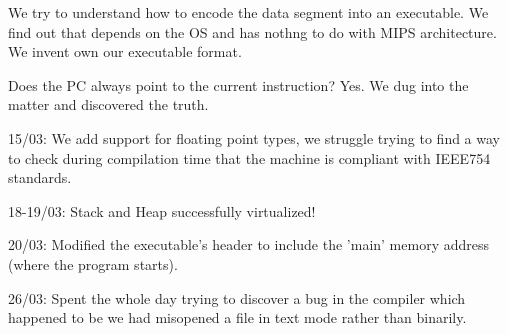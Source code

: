 \documentclass[12pt]{article}
\begin{document}
	We try to understand how to encode the data segment into an executable. We find out that depends on the OS and has nothng to do with MIPS architecture. We invent own our executable format.

	Does the PC always point to the current instruction? Yes. We dug into the matter and discovered the truth.

15/03:
	We add support for floating point types, we struggle trying to find a way to check during compilation time that the machine is compliant with IEEE754 standards.

18-19/03:
    Stack and Heap successfully virtualized!

20/03:
	Modified the executable's header to include the 'main' memory address (where the program starts).

26/03:
	Spent the whole day trying to discover a bug in the compiler which happened to be we had misopened a file in text mode rather than binarily.
\end{document}
